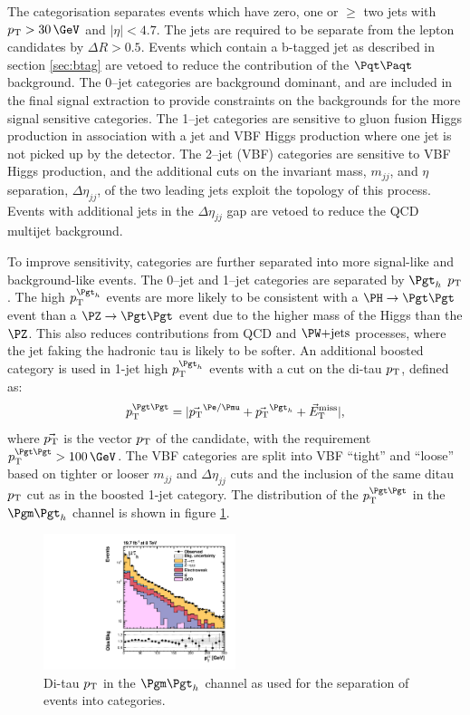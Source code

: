 The categorisation separates events which have zero, one or $\geq$ two jets with
$\pt > 30\,\GeV$
and $|\eta| < 4.7$. The jets are required to be separate from the lepton
candidates by $\Delta R > 0.5$. Events which contain a b-tagged jet as described in section
\ref{sec:btag} are vetoed to reduce the contribution of the $\ttbar$ background. 
The 0--jet categories are background dominant, and are included in the final
signal extraction to provide constraints on the backgrounds for the more signal
sensitive categories. The 1--jet categories are sensitive to gluon fusion Higgs
production in association with a jet and \ac{VBF} Higgs production where one jet is
not picked up by the detector. The 2--jet (VBF) categories are sensitive to
\ac{VBF} Higgs production, and the additional cuts on the invariant mass, $m_{jj}$,
and $\eta$ separation, $\Delta\eta_{jj}$, of the two leading
jets exploit the topology of this process. Events with additional jets in
the $\Delta \eta_{jj}$ gap are vetoed to reduce the QCD multijet background.

To improve sensitivity, categories are further separated into more signal-like
and background-like events. The 0--jet and 1--jet categories are separated by
$\Pgth$ $p_{\mathrm{T}}$. The high $\pt^{\Pgth}$ events are more likely to be
consistent with a $\HToTauTau$ event than a $\ZToTauTau$ event due to the higher
mass of the Higgs than the $\PZ$. This also reduces contributions from QCD
and $\WJets$ processes, where the jet faking the hadronic tau is likely to be
softer. An additional boosted category is used in 1-jet high $\pt^{\Pgth}$
events with a cut on the di-tau $p_{\mathrm{T}}$, defined as:
\begin{equation}
\pt^{\Pgt\Pgt} = |\vec{\pt}^{\Pe/\Pmu} + \vec{\pt}^{\Pgth}+\vecMET|,
\end{equation}
where $\vec{p_{\mathrm{T}}}$ is the vector $p_{\mathrm{T}}$ of the candidate, with the requirement 
$\pt^{\Pgt\Pgt}>100\,\GeV$. The VBF categories are split into VBF
``tight'' and ``loose'' based on tighter or looser $m_{jj}$ and
$\Delta\eta_{jj}$ cuts and the inclusion of the same ditau $p_{\mathrm{T}}$ cut as in the
boosted 1-jet category. The distribution of the $\pt^{\Pgt\Pgt}$ in the
$\mutau$ channel is shown in figure \ref{fig:ditaupt}. 

\begin{figure}[htb]
\begin{center}
    \includegraphics[width=0.5\textwidth]
      {plots/htt-sm/pt_tt_inclusive_mt_2012_log.pdf}
\end{center}
\caption{
 Di-tau $p_{\mathrm{T}}$ in the $\mutau$ channel as used for the separation of events into
 categories. 
}
\label{fig:ditaupt}
\end{figure}

